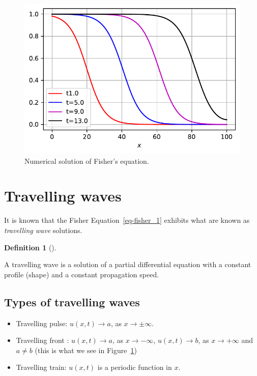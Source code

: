 \documentclass[
  letterpaper,
  DIV=11,
  numbers=noendperiod]{scrreprt}
\providecommand{\tightlist}{%
  \setlength{\itemsep}{0pt}\setlength{\parskip}{0pt}}\usepackage{longtable,booktabs,array}
\theoremstyle{definition}
\newtheorem{definition}{Definition}[chapter]
\theoremstyle{plain}
\theoremstyle{plain}
\theoremstyle{remark}
\begin{document}
\begin{figure}

{\centering \includegraphics{nonlinearreactiondiffusion_files/figure-pdf/fig-logisticpde-output-1.pdf}

}

\caption{\label{fig-logisticpde}Numerical solution of Fisher's
equation.}

\end{figure}

\hypertarget{travelling-waves}{%
\section{Travelling waves}\label{travelling-waves}}

It is known that the Fisher Equation~\ref{eq-fisher_1} exhibits what are
known as \emph{travelling wave} solutions.

\begin{definition}[]\protect\hypertarget{def-trwave}{}\label{def-trwave}

A travelling wave is a solution of a partial differential equation with
a constant profile (shape) and a constant propagation speed.

\end{definition}

\hypertarget{types-of-travelling-waves}{%
\subsection{Types of travelling waves}\label{types-of-travelling-waves}}

\begin{itemize}
\tightlist
\item
  Travelling pulse: \(u(x,t) \to a\), as \(x \to \pm \infty\).
\item
  Travelling front : \(u(x,t) \to a\), as \(x \to - \infty\),
  \(u(x,t) \to b\), as \(x \to + \infty\) and \(a\neq b\) (this is what
  we see in Figure~\ref{fig-logisticpde})
\item
  Travelling train: \(u(x,t)\) is a periodic function in \(x\).
\end{itemize}
\end{document}
